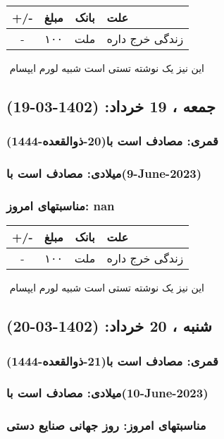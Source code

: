 \documentclass{article}
\newcommand{\rnote}[1]{\marginpar{\textcolor{color}{\StrSubstitute{\##1}{ }{\_}}}}
\newcommand{\myRow}[4]{
    #1 & #2 & #3 & #4 \\ \hline
}
\begin{document}
\begin{tabular}{ | c | c | c | p{5cm} |}
    \hline
    \myRow{ +/- }{مبلغ}{بانک}{علت}
    \myRow{-}{۱۰۰}{ملت}{زندگی خرج داره}
\end{tabular}
\newline
\newline

‌
\rnote{تست}
این نیز یک نوشته تستی است شبیه لورم ایپسام




\newpage
{}
\textcolor{color}{
\section{ جمعه ، 19 خرداد: (1402-03-19) }
\subsubsection*{قمری: مصادف است با(20-ذوالقعده-1444)} 
\subsubsection*{میلادی: مصادف است با(9-June-2023)}
\subsubsection*{مناسبتهای امروز: nan}
}


\begin{tabular}{ | c | c | c | p{5cm} |}
    \hline
    \myRow{ +/- }{مبلغ}{بانک}{علت}
    \myRow{-}{۱۰۰}{ملت}{زندگی خرج داره}
\end{tabular}
\newline
\newline

‌
\rnote{تست}
این نیز یک نوشته تستی است شبیه لورم ایپسام




\newpage
{}
\textcolor{color}{
\section{ شنبه ، 20 خرداد: (1402-03-20) }
\subsubsection*{قمری: مصادف است با(21-ذوالقعده-1444)} 
\subsubsection*{میلادی: مصادف است با(10-June-2023)}
\subsubsection*{مناسبتهای امروز: روز جهانی صنایع دستی}
}
\end{document}
